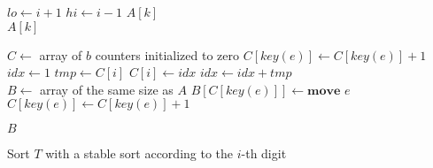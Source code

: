 \documentclass[landscape]{article}
\let\oldFunction\Function
\renewcommand{\Function}[2]{\oldFunction{\textcolor{sky}{#1}}{#2}}
\let\oldComment\Comment
\renewcommand{\Comment}[1]{\oldComment{\textcolor{gray}{#1}}}
\newcommand{\sepdotted}{\noindent\makebox[\linewidth]{\dotfill}}
\begin{document}
\begin{multicols*}{4}
\begin{algorithmic}
        \State $lo \gets i + 1$
        \State $hi \gets i - 1$
        \Else \Comment{$i = k$}
        \State \Return $A[k]$
        \EndIf
        \EndWhile\\
        \State \Return $A[k]$
        \EndFunction
    \end{algorithmic}
    \sepdotted
    \begin{algorithmic}
        \Function{TriComptage}{$A$, $n$, $b$, $key$}
        \State $C \gets$ array of $b$ counters initialized to zero
        \State $C[key(e)] \gets C[key(e)] + 1$
        \EndFor\\

        \State $idx \gets 1$
        \State $tmp \gets C[i]$
        \State $C[i] \gets idx$
        \State $idx \gets idx + tmp$
        \EndFor\\

        \State $B \gets$ array of the same size as $A$
        \State $B[C[key(e)]] \gets \textbf{move } e$
        \State $C[key(e)] \gets C[key(e)] + 1$
        \EndFor

        \State \Return $B$
        \EndFunction
    \end{algorithmic}
    \sepdotted
    \begin{algorithmic}
        \Function{TriParBase}{$T$, $d$}
        \State Sort $T$ with a stable sort according to
        \State the $i$-th digit
        \EndFor
        \EndFunction
    \end{algorithmic}
    \vfill\null
\end{multicols*}

\pagebreak
\end{document}
